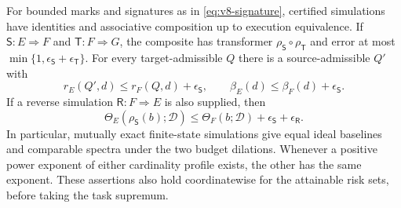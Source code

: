 \begin{theorem}
\label{thm:v8-spectrum}
For bounded marks and signatures as in \eqref{eq:v8-signature}, certified
simulations have identities and associative composition up to execution
equivalence. If $\mathsf S:E\Rightarrow F$ and
$\mathsf T:F\Rightarrow G$, the composite has transformer
$\rho_{\mathsf S}\circ\rho_{\mathsf T}$ and error at most
$\min\{1,\epsilon_{\mathsf S}+\epsilon_{\mathsf T}\}$.
For every target-admissible $Q$ there is a source-admissible $Q'$ with
\begin{equation}
 r_E(Q',d)\le r_F(Q,d)+\epsilon_{\mathsf S},\qquad
 \beta_E(d)\le\beta_F(d)+\epsilon_{\mathsf S}.          \label{eq:v8-rawtransport}
\end{equation}
If a reverse simulation $\mathsf R:F\Rightarrow E$ is also supplied,
then
\begin{equation}
 \Theta_E(\rho_{\mathsf S}(b);\mathcal D)
 \le\Theta_F(b;\mathcal D)+\epsilon_{\mathsf S}+\epsilon_{\mathsf R}.
                                                               \label{eq:v8-excesstransport}
\end{equation}
In particular, mutually exact finite-state simulations give equal ideal
baselines and comparable spectra under the two budget dilations.
Whenever a positive power exponent of either cardinality profile exists,
the other has the same exponent. These assertions also hold coordinatewise
for the attainable risk sets, before taking the task supremum.
\end{theorem}
